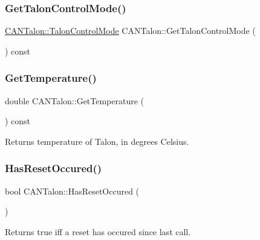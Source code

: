 \subsubsection{\texorpdfstring{Get\+Talon\+Control\+Mode()}{GetTalonControlMode()}}
{\footnotesize\ttfamily \hyperlink{class_c_a_n_talon_a0e4915b95f71a7091e3a1323f3ec9e1f}{C\+A\+N\+Talon\+::\+Talon\+Control\+Mode} C\+A\+N\+Talon\+::\+Get\+Talon\+Control\+Mode (\begin{DoxyParamCaption}{ }\end{DoxyParamCaption}) const}

\mbox{\label{class_c_a_n_talon_aab26bf049aa996de5fab27455ed956da}} 
\subsubsection{\texorpdfstring{Get\+Temperature()}{GetTemperature()}}
{\footnotesize\ttfamily double C\+A\+N\+Talon\+::\+Get\+Temperature (\begin{DoxyParamCaption}{ }\end{DoxyParamCaption}) const\hspace{0.3cm}{\ttfamily [override]}}

Returns temperature of Talon, in degrees Celsius. \mbox{\label{class_c_a_n_talon_a654c075c7d29bb9f2dcf91cc8a8f23fa}} 
\subsubsection{\texorpdfstring{Has\+Reset\+Occured()}{HasResetOccured()}}
{\footnotesize\ttfamily bool C\+A\+N\+Talon\+::\+Has\+Reset\+Occured (\begin{DoxyParamCaption}{ }\end{DoxyParamCaption})}

\begin{DoxyReturn}{Returns}
true iff a reset has occured since last call. 
\end{DoxyReturn}
\mbox{\label{class_c_a_n_talon_ae0a828862cd614d2fa372911205bd0ca}} 

